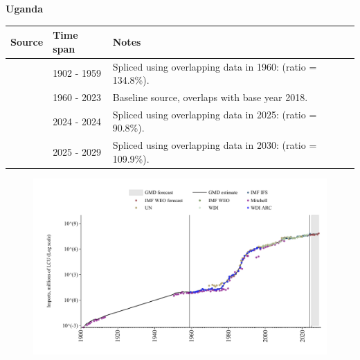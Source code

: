 \documentclass[12pt,a4paper,landscape]{article}
\begin{document}
\begin{adjustbox}{max totalsize={\paperwidth}{\paperheight},center}
\begin{minipage}[t][\textheight][t]{\textwidth}
\vspace*{0.5cm}
{}
\begin{center}
{\Large\bfseries Uganda}
\end{center}
\vspace{0.5cm}
\begin{table}[H]
\centering
\small
\begin{tabular}{|l|l|l|}
\hline
\textbf{Source} & \textbf{Time span} & \textbf{Notes} \\
\hline
\rowcolor{white}\cite{Mitchell}& 1902 - 1959 &Spliced using overlapping data in 1960: (ratio = 134.8\%).\\
\rowcolor{lightgray}\cite{WDI}& 1960 - 2023 &Baseline source, overlaps with base year 2018.\\
\rowcolor{white}\cite{IMF_IFS}& 2024 - 2024 &Spliced using overlapping data in 2025: (ratio = 90.8\%).\\
\rowcolor{lightgray}\cite{IMF_WEO_forecast}& 2025 - 2029 &Spliced using overlapping data in 2030: (ratio = 109.9\%).\\
\hline
\end{tabular}
\end{table}
\begin{figure}[H]
\centering
\includegraphics[width=\textwidth,height=0.6\textheight,keepaspectratio]{graphs/UGA_imports.pdf}
\end{figure}
\end{minipage}
\end{adjustbox}
\end{document}
